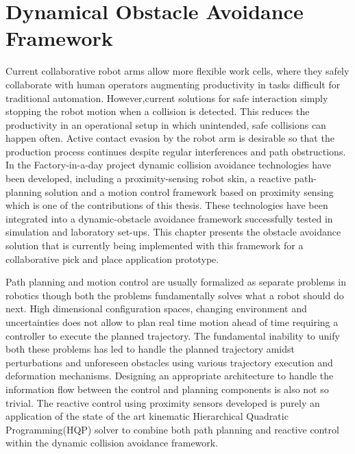 
\chapter{Dynamical Obstacle Avoidance Framework}
\label{chapter:framework}
Current collaborative robot arms allow more flexible work cells, where they safely collaborate with human operators augmenting productivity in tasks difficult for traditional automation. However,current solutions for safe interaction simply stopping the robot motion  when a collision is detected. This reduces the productivity in an operational setup in which unintended, safe collisions can happen often. Active contact evasion by the robot arm is desirable so that the production process continues despite regular interferences and path obstructions. In the Factory-in-a-day project dynamic collision avoidance technologies have been developed, including a proximity-sensing robot skin, a reactive path-planning solution and a motion control framework based on proximity sensing which is one of the contributions of this  thesis. These technologies have been integrated into a dynamic-obstacle avoidance framework successfully tested in simulation and laboratory set-ups. This chapter presents the obstacle avoidance solution that is currently being implemented with this framework for a collaborative pick and place application prototype. 

Path planning and motion control are usually formalized as separate problems in robotics though both the problems fundamentally solves what a robot should do next. High dimensional configuration spaces, changing environment and uncertainties does not allow to plan real time motion ahead of time requiring a controller to execute the planned trajectory. The fundamental inability to unify both these problems has led to handle the planned trajectory amidst perturbations and unforeseen obstacles using various trajectory execution and deformation mechanisms. Designing an appropriate architecture to handle the information flow between the control and planning components is also not so trivial. The reactive control using proximity sensors developed is purely an application of the state of the art kinematic Hierarchical Quadratic Programming(HQP) solver to combine both path planning and reactive control within the dynamic collision avoidance framework.




% 


